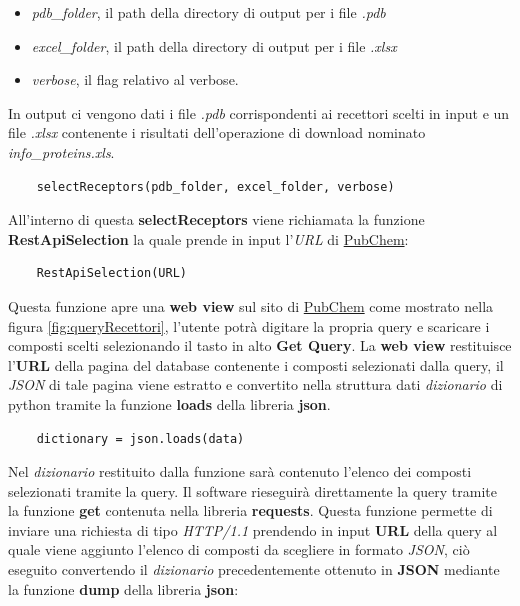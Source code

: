 \begin{itemize}
    \item \textit{pdb\_folder}, il path della directory di output per i file \textit{.pdb}
    \item \textit{excel\_folder}, il path della directory di output per i file \textit{.xlsx}
    \item \textit{verbose}, il flag relativo al verbose.
\end{itemize}

In output ci vengono dati i file \textit{.pdb} corrispondenti ai recettori scelti in input e un file \textit{.xlsx} contenente i risultati dell'operazione di download nominato \textit{info\_proteins.xls}.

\begin{verbatim}
    selectReceptors(pdb_folder, excel_folder, verbose)
\end{verbatim}

All'interno di questa \textbf{selectReceptors} viene richiamata la funzione \textbf{RestApiSelection} la quale prende in input l'\textit{URL} di \href{https://www.rcsb.org/search}{PubChem}:
\begin{verbatim}
    RestApiSelection(URL)
\end{verbatim}

Questa funzione apre una \textbf{web view} sul sito di \href{https://www.rcsb.org/search}{PubChem} come mostrato nella figura \ref{fig:queryRecettori}, l'utente potrà digitare la propria query e scaricare i composti scelti selezionando il tasto in alto \textbf{Get Query}.\newline
La \textbf{web view} restituisce l'\textbf{URL} della pagina del database contenente i composti selezionati dalla query, il \textit{JSON} di tale pagina viene estratto e convertito nella struttura dati \textit{dizionario} di python tramite la funzione \textbf{loads} della libreria \textbf{json}.

\begin{verbatim}
    dictionary = json.loads(data)
\end{verbatim}

Nel \textit{dizionario} restituito dalla funzione sarà contenuto l'elenco dei composti selezionati tramite la query.\newline
Il software rieseguirà direttamente la query tramite la funzione \textbf{get} contenuta nella libreria \textbf{requests}. Questa funzione permette di inviare una richiesta di tipo \textit{HTTP/1.1} prendendo in input \textbf{URL} della query al quale viene aggiunto l'elenco di composti da scegliere in formato \textit{JSON}, ciò eseguito convertendo il \textit{dizionario} precedentemente ottenuto in \textbf{JSON}
mediante la funzione \textbf{dump} della libreria \textbf{json}:

